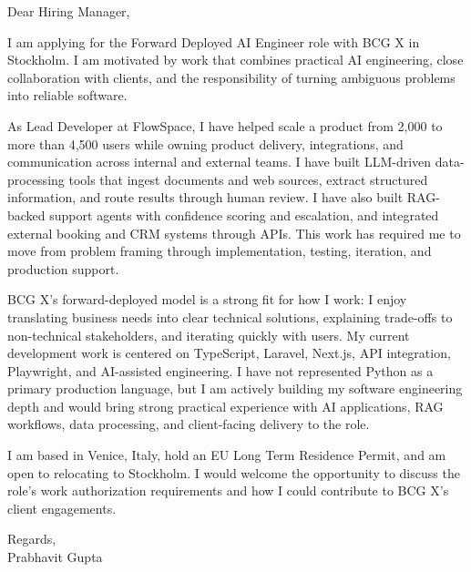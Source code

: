 \documentclass[a4paper,11pt]{article}
\begin{document}
Dear Hiring Manager,

I am applying for the Forward Deployed AI Engineer role with BCG X in Stockholm. I am motivated by work that combines practical AI engineering, close collaboration with clients, and the responsibility of turning ambiguous problems into reliable software.

As Lead Developer at FlowSpace, I have helped scale a product from 2,000 to more than 4,500 users while owning product delivery, integrations, and communication across internal and external teams. I have built LLM-driven data-processing tools that ingest documents and web sources, extract structured information, and route results through human review. I have also built RAG-backed support agents with confidence scoring and escalation, and integrated external booking and CRM systems through APIs. This work has required me to move from problem framing through implementation, testing, iteration, and production support.

BCG X's forward-deployed model is a strong fit for how I work: I enjoy translating business needs into clear technical solutions, explaining trade-offs to non-technical stakeholders, and iterating quickly with users. My current development work is centered on TypeScript, Laravel, Next.js, API integration, Playwright, and AI-assisted engineering. I have not represented Python as a primary production language, but I am actively building my software engineering depth and would bring strong practical experience with AI applications, RAG workflows, data processing, and client-facing delivery to the role.

I am based in Venice, Italy, hold an EU Long Term Residence Permit, and am open to relocating to Stockholm. I would welcome the opportunity to discuss the role's work authorization requirements and how I could contribute to BCG X's client engagements.

Regards,\\
Prabhavit Gupta
\end{document}
